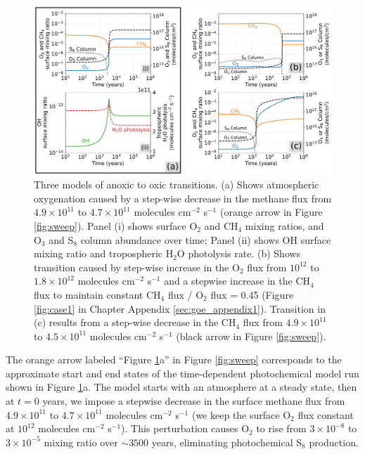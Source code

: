 \begin{figure}
  \centering
  \includegraphics[width=\textwidth]{tex/4goe/main/Oxygenation.pdf}
  \caption{Three models of anoxic to oxic transitions. (a) Shows atmospheric oxygenation caused by a step-wise decrease in the methane flux from $4.9 \times 10^{11}$ to $4.7 \times 10^{11}$ molecules cm$^{-2}$ s$^{-1}$ (orange arrow in Figure \ref{fig:sweep}). Panel (i) shows surface O$_2$ and CH$_4$ mixing ratios, and O$_3$ and S$_8$ column abundance over time; Panel (ii) shows OH surface mixing ratio and tropospheric H$_2$O photolysis rate. (b) Shows transition caused by step-wise increase in the O$_2$ flux from $10^{12}$ to $1.8 \times 10^{12}$ molecules cm$^{-2}$ s$^{-1}$ and a stepwise increase in the CH$_4$ flux to maintain constant CH$_4$ flux / O$_2$ flux = 0.45 (Figure \ref{fig:case1} in Chapter Appendix \ref{sec:goe_appendix1}). Transition in (c) results from a step-wise decrease in the CH$_4$ flux from $4.9 \times 10^{11}$ to $4.5 \times 10^{11}$ molecules cm$^{-2}$ s$^{-1}$ (black arrow in Figure \ref{fig:sweep}).}
  \label{fig:oxygenation}
\end{figure}

The orange arrow labeled ``Figure \ref{fig:oxygenation}a'' in Figure \ref{fig:sweep} corresponds to the approximate start and end states of the time-dependent photochemical model run shown in Figure \ref{fig:oxygenation}a. The model starts with an atmosphere at a steady state, then at $t = 0$ years, we impose a stepwise decrease in the surface methane flux from $4.9 \times 10^{11}$ to $4.7 \times 10^{11}$ molecules cm$^{-2}$ s$^{-1}$ (we keep the surface O$_2$ flux constant at $10^{12}$ molecules cm$^{-2}$ s$^{-1}$). This perturbation causes O$_2$ to rise from $3 \times 10^{-8}$ to $3 \times 10^{-5}$ mixing ratio over $\sim 3500$ years, eliminating photochemical S$_8$ production. 

